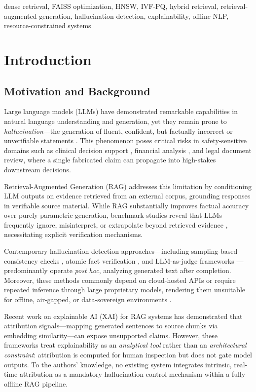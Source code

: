 \documentclass[conference]{IEEEtran}
\begin{document}
\begin{IEEEkeywords}
dense retrieval, FAISS optimization, HNSW, IVF-PQ, hybrid retrieval, retrieval-augmented generation, hallucination detection, explainability, offline NLP, resource-constrained systems
\end{IEEEkeywords}

\section{Introduction}

\subsection{Motivation and Background}

Large language models (LLMs) have demonstrated remarkable capabilities in natural language understanding and generation, yet they remain prone to \emph{hallucination}—the generation of fluent, confident, but factually incorrect or unverifiable statements \cite{ji2023survey,huang2025survey}. This phenomenon poses critical risks in safety-sensitive domains such as clinical decision support \cite{pal2023medical}, financial analysis \cite{islam2023financebench}, and legal document review, where a single fabricated claim can propagate into high-stakes downstream decisions.

Retrieval-Augmented Generation (RAG) \cite{lewis2020rag} addresses this limitation by conditioning LLM outputs on evidence retrieved from an external corpus, grounding responses in verifiable source material. While RAG substantially improves factual accuracy over purely parametric generation, benchmark studies reveal that LLMs frequently ignore, misinterpret, or extrapolate beyond retrieved evidence \cite{chen2024benchmarking,niu2024ragtruth}, necessitating explicit verification mechanisms.

Contemporary hallucination detection approaches—including sampling-based consistency checks \cite{manakul2023selfcheckgpt}, atomic fact verification \cite{min2023factscore}, and LLM-as-judge frameworks \cite{es2024ragas}—predominantly operate \emph{post hoc}, analyzing generated text after completion. Moreover, these methods commonly depend on cloud-hosted APIs or require repeated inference through large proprietary models, rendering them unsuitable for offline, air-gapped, or data-sovereign environments \cite{krainovskikh2026domain}. 

Recent work on explainable AI (XAI) for RAG systems \cite{zhang2024feel,agrawal2024attributed} has demonstrated that attribution signals—mapping generated sentences to source chunks via embedding similarity—can expose unsupported claims. However, these frameworks treat explainability as an \emph{analytical tool} rather than an \emph{architectural constraint}: attribution is computed for human inspection but does not gate model outputs. To the authors' knowledge, no existing system integrates intrinsic, real-time attribution as a mandatory hallucination control mechanism within a fully offline RAG pipeline.
\end{document}
